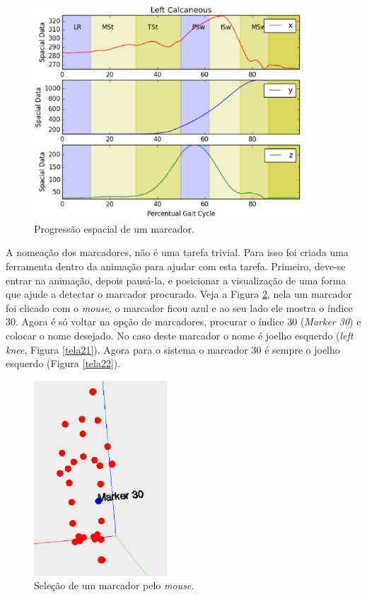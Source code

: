 \begin{figure}[H]
	\centering
	\includegraphics[width=10cm]{figuras/tela19.eps}
	\caption{Progressão espacial de um marcador.}
	\label{tela19}
\end{figure}

A nomeação dos marcadores, não é uma tarefa trivial. Para isso foi criada uma ferramenta dentro da animação para ajudar com esta tarefa. Primeiro, deve-se entrar na animação, depois pausá-la, e posicionar a visualização de uma forma que ajude a detectar o marcador procurado. Veja a Figura \ref{tela20}, nela um marcador foi clicado com o \emph{mouse}, o marcador ficou azul e ao seu lado ele mostra o índice 30. 
Agora é só voltar na opção de marcadores, procurar o índice 30 (\emph{Marker 30}) e colocar o nome desejado. No caso deste marcador o nome é joelho esquerdo (\emph{left knee}, Figura \ref{tela21}).
Agora para o sistema o marcador 30 é sempre o joelho esquerdo (Figura \ref{tela22}).

\begin{figure}[H]
	\centering
	\includegraphics[width=5cm]{figuras/tela20.eps}
	\caption{Seleção de um marcador pelo \emph{mouse}.}
\label{tela20}
\end{figure}

